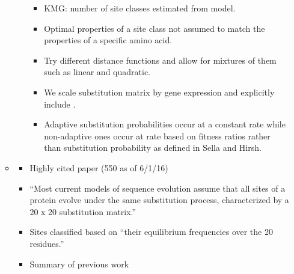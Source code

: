 \begin{itemize}
\begin{itemize}
\begin{itemize}
  \begin{itemize}
  \item KMG: number of site classes estimated from model.
  \item Optimal properties of a site class not assumed to match the  properties of a specific amino acid.
  \item Try different distance functions and allow for mixtures of them such as linear and quadratic.
  \item We scale substitution matrix by gene expression and explicitly include \Ne.
  \item Adaptive substitution probabilities occur at a constant rate while non-adaptive ones occur at rate based on fitness ratios rather than substitution probability as defined in Sella and Hirsh.
  \end{itemize}
    \end{itemize}
  \item \citet{LartillotAndPhilippe04} 
    \begin{itemize}
    \item Highly cited paper (550 as of 6/1/16)
    \item ``Most current models of sequence evolution assume that all sites of a protein evolve under the same substitution process, characterized by a 20 x 20 substitution matrix.''
      \item Sites classified based on ``their equilibrium frequencies over the 20 residues.''
      \item Summary of previous work
        \begin{quote}

\end{quote}
\end{itemize}
\end{itemize}
\end{itemize}
